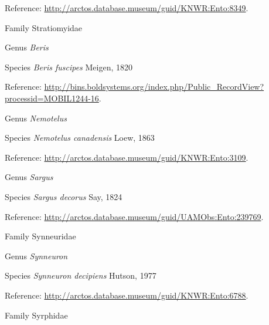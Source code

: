 \documentclass[9pt, article]{memoir}
\begin{document}
\begin{multicols}{2}
Reference: 
\url{http://arctos.database.museum/guid/KNWR:Ento:8349}.

\vspace{6pt}\noindent\hspace{24pt}Family Stratiomyidae


\vspace{6pt}\noindent\hspace{30pt}Genus \textit{Beris}


\vspace{6pt}\noindent\hspace{36pt}Species \textit{Beris fuscipes} Meigen, 1820


Reference: 
\url{http://bins.boldsystems.org/index.php/Public_RecordView?processid=MOBIL1244-16}.

\vspace{6pt}\noindent\hspace{30pt}Genus \textit{Nemotelus}


\vspace{6pt}\noindent\hspace{36pt}Species \textit{Nemotelus canadensis} Loew, 1863


Reference: 
\url{http://arctos.database.museum/guid/KNWR:Ento:3109}.

\vspace{6pt}\noindent\hspace{30pt}Genus \textit{Sargus}


\vspace{6pt}\noindent\hspace{36pt}Species \textit{Sargus decorus} Say, 1824


Reference: 
\url{http://arctos.database.museum/guid/UAMObs:Ento:239769}.

\vspace{6pt}\noindent\hspace{24pt}Family Synneuridae


\vspace{6pt}\noindent\hspace{30pt}Genus \textit{Synneuron}


\vspace{6pt}\noindent\hspace{36pt}Species \textit{Synneuron decipiens} Hutson, 1977


Reference: 
\url{http://arctos.database.museum/guid/KNWR:Ento:6788}.

\vspace{6pt}\noindent\hspace{24pt}Family Syrphidae



\end{multicols}
\end{document}
